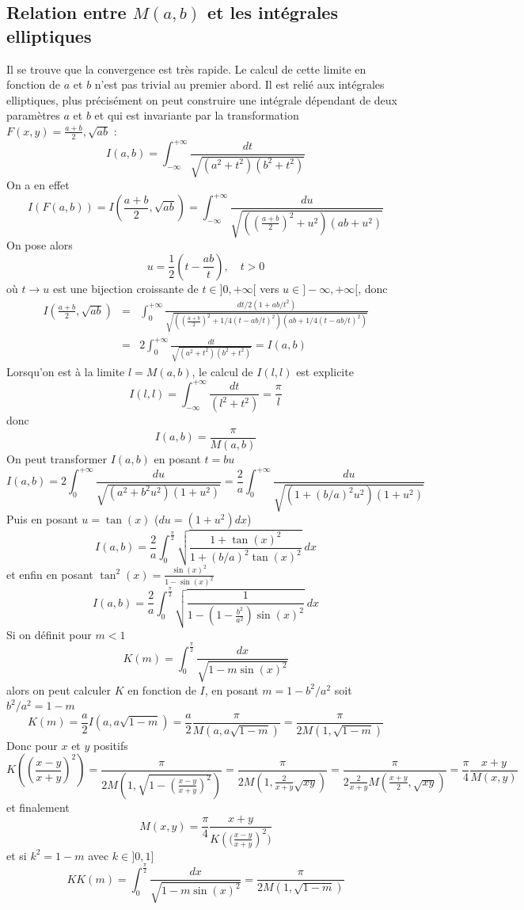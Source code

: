\documentclass[a4paper,11pt]{book}
\begin{document}
\subsection{Relation entre $M(a,b)$ et les int\'egrales elliptiques}
 Il se trouve que la convergence est tr\`es rapide. Le calcul de cette limite 
en fonction de $a$ et $b$ n'est pas trivial au premier abord. Il est reli\'e 
aux int\'egrales elliptiques, plus pr\'ecis\'ement on peut construire une 
int\'egrale d\'ependant de deux param\`etres $a$ et $b$ et qui est invariante 
par la transformation $F(x,y)=\frac{a+b}{2},\sqrt{ab}$ :
\[ I(a,b)=\int_{-\infty}^{+\infty}  \frac{dt} {\sqrt{(a^2+t^2)(b^2+t^2)}}
\]
On a en effet
\[ I(F(a,b))=I(\frac{a+b}{2},\sqrt{ab})
= \int_{-\infty}^{+\infty}  \frac{du}{\sqrt{((\frac{a+b}{2})^2+u^2)(ab+u^2)}} \]
On pose alors 
\[ u=\frac{1}{2} (t-\frac{ab}{t}), \quad t>0 \]
o\`u $t \rightarrow u$ est une bijection croissante de $t\in]0,+\infty[$ vers 
$u \in ]-\infty,+\infty[$, donc
\begin{eqnarray*}
I(\frac{a+b}{2},\sqrt{ab})
&=& \int_{0}^{+\infty}  \frac{dt/2(1+ab/t^2)}{\sqrt{((\frac{a+b}{2})^2+1/4(t-ab/t)^2)(ab+1/4(t-ab/t)^2)}}\\
&=& 2 \int_{0}^{+\infty} \frac{dt}{\sqrt{(a^2+t^2)(b^2+t^2)}}
= I(a,b)
\end{eqnarray*}
Lorsqu'on est \`a la limite $l=M(a,b)$, le calcul de $I(l,l)$ est explicite
\[ I(l,l)=\int_{-\infty}^{+\infty}  \frac{dt}{(l^2+t^2)} = \frac{\pi}{l}\]
donc
\[ I(a,b)=\frac{\pi}{M(a,b)}\]
On peut transformer $I(a,b)$ en posant $t=bu$
\[ I(a,b)=2\int_{0}^{+\infty}  \frac{du}{\sqrt{(a^2+b^2u^2)(1+u^2)}}
= \frac{2}{a} \int_{0}^{+\infty}  \frac{du}{\sqrt{(1+(b/a)^2u^2)(1+u^2)}} \]
Puis en posant $u=\tan(x)$ ($du=(1+u^2) dx$)
\[ I(a,b)=\frac{2}{a} \int_0^{\frac{\pi}{2}} 
\sqrt{\frac{1+\tan(x)^2}{1+(b/a)^2\tan(x)^2}} \ dx \]
et enfin en posant $\tan^2(x)=\frac{\sin(x)^2}{1-\sin(x)^2}$
\[ I(a,b)= \frac{2}{a} \int_0^{\frac{\pi}{2}}  
\sqrt{ \frac{1}{1-(1-\frac{b^2}{a^2})\sin(x)^2} } \ dx\]
Si on d\'efinit pour $m<1$
\[ K(m)=\int_0^{\frac{\pi}{2}} \frac{dx}{\sqrt{1-m \sin(x)^2}} \]
alors on peut calculer $K$ en fonction de $I$, en posant
$m=1-b^2/a^2$ soit $b^2/a^2=1-m$
\[ K(m)=\frac{a}{2} I(a,a\sqrt{1-m})=\frac{a}{2}\frac{\pi}{M(a,a\sqrt{1-m})}
= \frac{\pi}{2M(1,\sqrt{1-m})} \]
Donc pour $x$ et $y$ positifs
\[ K( (\frac{x-y}{x+y})^2 )=  \frac{\pi}{2M(1,\sqrt{1-(\frac{x-y}{x+y})^2})}
=  \frac{\pi}{2M(1,\frac{2}{x+y}\sqrt{xy})}
= \frac{\pi}{2 \frac{2}{x+y} M(\frac{x+y}{2},\sqrt{xy}) }
= \frac{\pi}{4} \frac{x+y}{M(x,y)}
\]
et finalement
\[ M(x,y)=\frac{\pi}{4} \frac{x+y}{ K\left( (\frac{x-y}{x+y}\right)^2 )}\]
et si $k^2=1-m$ avec $k\in ]0,1]$
\begin{equation} K
K(m)=\int_0^{\frac{\pi}{2}} \frac{dx}{\sqrt{1-m \sin(x)^2}}= 
\frac{\pi}{2M(1,\sqrt{1-m})} 
\end{equation}
\end{document}
